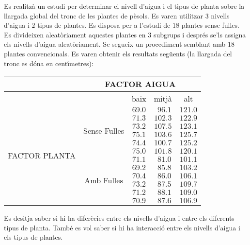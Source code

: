 \begin{prob}
{Es realitz\`a un estudi per 
determinar el nivell d'aigua i el tipus de planta sobre
la llargada global del tronc de les plantes de p\`esols.
Es varen utilitzar $3$ nivells d'aigua i $2$ tipus de
plantes. Es disposa per a l'estudi de $18$ plantes sense
fulles. Es divideixen aleat\`oriament aquestes plantes en $3$
subgrups i despr\'es se'ls assigna els nivells d'aigua
aleat\`oriament. Se segueix un procediment
semblant amb $18$ plantes convencionals. Es varen obtenir
els resultats seg\"uents (la llargada del tronc es d\'ona
en cent\'{\i}metres):
\newpage
\begin{center}
\begin{tabular}{c|c|c|c|c|}
&\multicolumn{4}{c|}{FACTOR AIGUA}\\\hline
& &{baix}&{mitj\`a}&{alt}\\\cline{3-5}
\multirow{12}{1.75cm}{FACTOR PLANTA}&\multirow{6}{1cm}{Sense Fulles}&
$69.0$&$\ \,96.1$&$121.0$\\\cline{3-5}
&&$71.3$&$102.3$&$122.9$\\\cline{3-5}
&&$73.2$&$107.5$&$123.1$\\\cline{3-5}
&&$75.1$&$103.6$&$125.7$\\\cline{3-5}
&&$74.4$&$100.7$&$125.2$\\\cline{3-5}
&&$75.0$&$101.8$&$120.1$\\\cline{2-5}
&\multirow{6}{1cm}{Amb Fulles}&$71.1$&$\ \,81.0$&$101.1$\\\cline{3-5}
&&$69.2$&$\ \,85.8$&$103.2$\\\cline{3-5}
&&$70.4$&$\ \,86.0$&$106.1$\\\cline{3-5}
&&$73.2$&$\ \,87.5$&$109.7$\\\cline{3-5}
&&$71.2$&$\ \,88.1$&$109.0$\\\cline{3-5}
&&$70.9$&$\ \,87.6$&$106.9$\\\hline
\end{tabular}
\end{center} 

Es desitja saber si hi ha difer\`ecies entre els nivells
d'aigua i entre els diferents tipus de planta. Tamb\'e es
vol saber si hi ha interacci\'o entre els nivells d'aigua
i els tipus de plantes.}
\end{prob}

